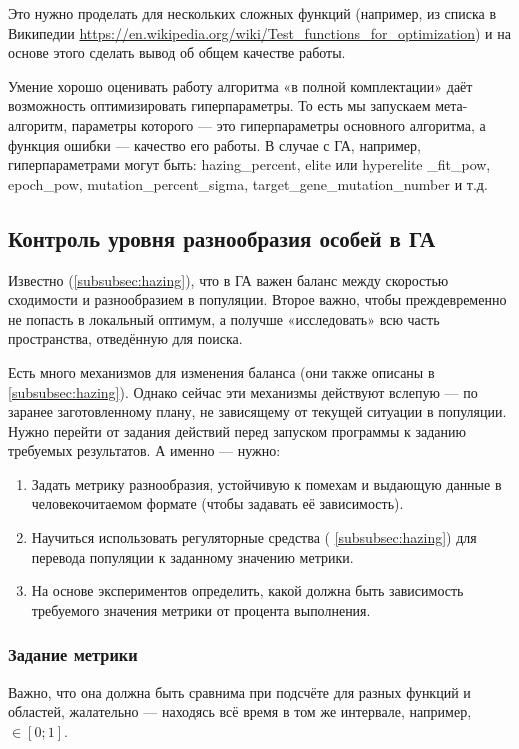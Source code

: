Это нужно проделать для нескольких сложных функций (например, из списка в Википедии \href{https://en.wikipedia.org/wiki/Test_functions_for_optimization}{https://en.wikipedia.org/wiki/Test_functions_for_optimization})
и на основе этого сделать вывод об общем качестве работы.

Умение хорошо оценивать работу алгоритма «в полной комплектации» даёт возможность оптимизировать гиперпараметры.
То есть мы запускаем мета-алгоритм, параметры которого — это гиперпараметры основного алгоритма, а функция ошибки — качество его работы.
В случае с ГА, например, гиперпараметрами могут быть: hazing\_percent, elite или hyperelite \_fit\_pow, epoch\_pow, mutation\_percent\_sigma, target\_gene\_mutation\_number и т.д.


\subsection{Контроль уровня разнообразия особей в ГА}\label{subsec:control_GA_diversity}
Известно (\ref{subsubsec:hazing}), что в ГА важен баланс между скоростью сходимости и разнообразием в популяции.
Второе важно, чтобы преждевременно не попасть в локальный оптимум, а получше «исследовать» всю часть пространства, отведённую для поиска.

Есть много механизмов для изменения баланса (они также описаны в \ref{subsubsec:hazing}).
Однако сейчас эти механизмы действуют вслепую — по заранее заготовленному плану, не зависящему от текущей ситуации в популяции.
Нужно перейти от задания действий перед запуском программы к заданию требуемых результатов.
А именно — нужно:
\begin{enumerate}
    \item Задать метрику разнообразия, устойчивую к помехам и выдающую данные в человекочитаемом формате (чтобы задавать её зависимость).
    \item Научиться использовать регуляторные средства ( \ref{subsubsec:hazing}) для перевода популяции к заданному значению метрики.
    \item На основе экспериментов определить, какой должна быть зависимость требуемого значения метрики от процента выполнения.
\end{enumerate}

\subsubsection{Задание метрики}
Важно, что она должна быть сравнима при подсчёте для разных функций и областей, жалательно — находясь всё время в том же интервале, например,
$\in [0; 1]$.

